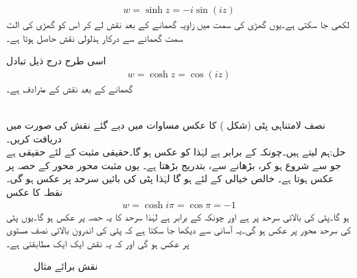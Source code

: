 \begin{align}\label{مساوات_نقش_ہذلولی_سائن_تفاعل}
w=\sinh z=-i\sin (iz)
\end{align}
لکھی جا سکتی ہے۔یوں گھڑی کی سمت میں  زاویہ گھمانے  کے بعد نقش  لے کر اس کو گھڑی کی الٹ سمت   گھمانے سے درکار ہذلولی نقش حاصل ہوتا ہے۔

اسی طرح درج ذیل تبادل
\begin{align}\label{مساوات_نقش_ہذلولی_کوسائن_تفاعل}
w=\cosh z=\cos (iz)
\end{align}
گھمانے  کے بعد نقش  کے مترادف ہے۔ 

\quad {}\\
نصف لامتناہی پٹی  (شکل ) کا عکس مساوات  میں دیے گئے نقش کی صورت میں دریافت کریں۔\\
حل:\quad ہم  لیتے ہیں۔چونکہ  کے برابر ہے لہٰذا  کو عکس  ہو گا۔حقیقی مثبت  کے لئے  حقیقی ہے جو  سے شروع ہو کر،  بڑھانے سے، بتدریج بڑھتا ہے۔ یوں مثبت  محور  محور کے حصہ  پر عکس ہوتا ہے۔ خالص خیالی  کے لئے  ہو گا لہٰذا پٹی کی بائیں سرحد  پر عکس ہو گی۔نقطہ  کا عکس
\begin{align*}
w=\cosh i\pi=\cos \pi=-1
\end{align*} 
ہو گا۔پٹی کی بالائی سرحد پر  ہے اور چونکہ  کے برابر ہے لہٰذا سرحد کا یہ حصہ  پر عکس ہو گا۔یوں پٹی کی سرحد  محور پر عکس ہو گی۔یہ آسانی سے دیکھا جا سکتا ہے کہ پٹی کی اندرون بالائی نصف  مستوی پر عکس ہو گی اور  کہ یہ نقش ایک ایک مطابقتی ہے۔
\begin{figure}
\centering
\begin{subfigure}{0.45\textwidth}
\centering
{}
\end{subfigure} \hfill
\begin{subfigure}{0.45\textwidth}
\centering
{}
\end{subfigure} \hfill
\caption{نقش برائے مثال }
\label{شکل_مثال_نقش_ہذلولی_کوسائن_عکس-لامتناہی_پٹی}
\end{figure}
